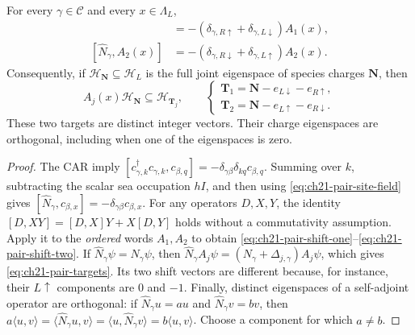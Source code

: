 \begin{lemma}
\label{lem:ch21-singlet-shifts}
For every \(\gamma\in\mathcal C\) and every \(x\in\Lambda_L\),
\begin{align}
 [\widehat N_\gamma,A_1(x)]
   &=-(\delta_{\gamma,R\uparrow}+\delta_{\gamma,L\downarrow})A_1(x),
   \label{eq:ch21-pair-shift-one}\\
 [\widehat N_\gamma,A_2(x)]
   &=-(\delta_{\gamma,R\downarrow}+\delta_{\gamma,L\uparrow})A_2(x).
   \label{eq:ch21-pair-shift-two}
\end{align}
Consequently, if \(\mathcal H_{\mathbf N}\subseteq\mathcal H_L\)
is the full joint eigenspace of species charges \(\mathbf N\), then
\begin{equation}
 A_j(x)\mathcal H_{\mathbf N}\subseteq\mathcal H_{\mathbf T_j},
 \qquad\begin{cases}
 \mathbf T_1=\mathbf N-e_{L\downarrow}-e_{R\uparrow},\\
 \mathbf T_2=\mathbf N-e_{L\uparrow}-e_{R\downarrow}.
 \end{cases}
 \label{eq:ch21-pair-targets}
\end{equation}
These two targets are distinct integer vectors.  Their charge eigenspaces
are orthogonal, including when one of the eigenspaces is zero.
\end{lemma}

\begin{proof}
The CAR imply
\([c_{\gamma,k}^\dagger c_{\gamma,k},c_{\beta,q}]
=-\delta_{\gamma\beta}\delta_{kq}c_{\beta,q}\).
Summing over \(k\), subtracting the scalar sea occupation \(hI\), and
then using \eqref{eq:ch21-pair-site-field} gives
\([\widehat N_\gamma,c_{\beta,x}]
=-\delta_{\gamma\beta}c_{\beta,x}\).
For any operators \(D,X,Y\), the identity
\([D,XY]=[D,X]Y+X[D,Y]\) holds without a commutativity
assumption.  Apply it to the \emph{ordered} words \(A_1,A_2\) to obtain
\eqref{eq:ch21-pair-shift-one}--\eqref{eq:ch21-pair-shift-two}.
If \(\widehat N_\gamma\psi=N_\gamma\psi\), then
\(\widehat N_\gamma A_j\psi=(N_\gamma+\Delta_{j,\gamma})A_j\psi\),
which gives \eqref{eq:ch21-pair-targets}.  Its two shift vectors are
different because, for instance, their \(L\uparrow\) components are
\(0\) and \(-1\).  Finally, distinct eigenspaces of a self-adjoint
operator are orthogonal: if \(\widehat N_\gamma u=au\) and
\(\widehat N_\gamma v=bv\), then
\(a\langle u,v\rangle=\langle\widehat N_\gamma u,v\rangle
=\langle u,\widehat N_\gamma v\rangle=b\langle u,v\rangle\).
Choose a component for which \(a\ne b\).
\end{proof}

